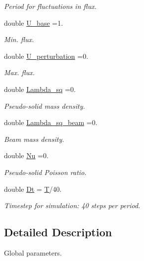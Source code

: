 \begin{DoxyCompactItemize}
\begin{DoxyCompactList}\small\item\em Period for fluctuations in flux. \end{DoxyCompactList}\item 
double \hyperlink{namespaceGlobal__Parameters_a6c27745997f9e118f0a99bf0390dbf4b}{U\+\_\+base} =1.
\begin{DoxyCompactList}\small\item\em Min. flux. \end{DoxyCompactList}\item 
double \hyperlink{namespaceGlobal__Parameters_ac04d493b5af4d1c99a9574489cf4dda0}{U\+\_\+perturbation} =0.
\begin{DoxyCompactList}\small\item\em Max. flux. \end{DoxyCompactList}\item 
double \hyperlink{namespaceGlobal__Parameters_a3e3428638f89f970fcf2148b0bab1465}{Lambda\+\_\+sq} =0.
\begin{DoxyCompactList}\small\item\em Pseudo-\/solid mass density. \end{DoxyCompactList}\item 
double \hyperlink{namespaceGlobal__Parameters_af35d88426851c22dd07a69aa66de959a}{Lambda\+\_\+sq\+\_\+beam} =0.
\begin{DoxyCompactList}\small\item\em Beam mass density. \end{DoxyCompactList}\item 
double \hyperlink{namespaceGlobal__Parameters_a20fccdcfa2c15ad8b951b9ada3bb1661}{Nu} =0.
\begin{DoxyCompactList}\small\item\em Pseudo-\/solid Poisson ratio. \end{DoxyCompactList}\item 
double \hyperlink{namespaceGlobal__Parameters_ab29c9f716872de235c78e62bce2c4109}{Dt} = \hyperlink{namespaceGlobal__Parameters_aeb964d25d190afd43c8317d4217f31b4}{T}/40.
\begin{DoxyCompactList}\small\item\em Timestep for simulation\+: 40 steps per period. \end{DoxyCompactList}\end{DoxyCompactItemize}


\subsection{Detailed Description}
Global parameters. 

